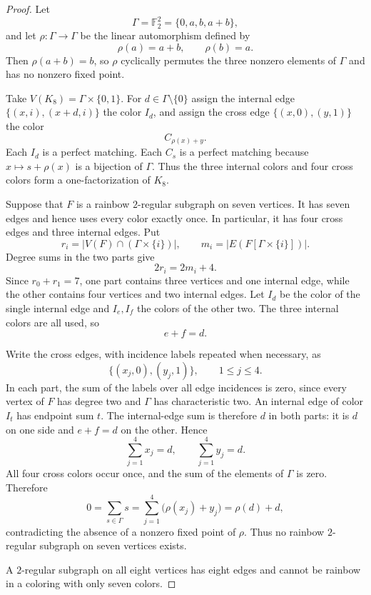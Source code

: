 \documentclass[11pt]{amsart}
\newcommand{\F}{\mathbb{F}}
\begin{document}
\begin{proof}
Let
\[
  \Gamma=\F_2^2=\{0,a,b,a+b\},
\]
and let $\rho\colon\Gamma\to\Gamma$ be the linear automorphism defined by
\[
  \rho(a)=a+b,
  \qquad
  \rho(b)=a.
\]
Then $\rho(a+b)=b$, so $\rho$ cyclically permutes the three nonzero
elements of $\Gamma$ and has no nonzero fixed point.

Take $V(K_8)=\Gamma\times\{0,1\}$.  For $d\in\Gamma\setminus\{0\}$ assign
the internal edge $\{(x,i),(x+d,i)\}$ the color $I_d$, and assign the
cross edge $\{(x,0),(y,1)\}$ the color
\[
  C_{\rho(x)+y}.
\]
Each $I_d$ is a perfect matching.  Each $C_s$ is a perfect matching
because $x\mapsto s+\rho(x)$ is a bijection of $\Gamma$.  Thus the three
internal colors and four cross colors form a one-factorization of $K_8$.

Suppose that $F$ is a rainbow $2$-regular subgraph on seven vertices.
It has seven edges and hence uses every color exactly once.  In
particular, it has four cross edges and three internal edges.  Put
\[
  r_i=\lvert V(F)\cap(\Gamma\times\{i\})\rvert,
  \qquad
  m_i=\lvert E(F[\Gamma\times\{i\}])\rvert.
\]
Degree sums in the two parts give
\[
  2r_i=2m_i+4.
\]
Since $r_0+r_1=7$, one part contains three vertices and one internal edge,
while the other contains four vertices and two internal edges.  Let
$I_d$ be the color of the single internal edge and $I_e,I_f$ the colors
of the other two.  The three internal colors are all used, so
\[
  e+f=d.
\]

Write the cross edges, with incidence labels repeated when necessary, as
\[
  \{(x_j,0),(y_j,1)\},
  \qquad 1\le j\le4.
\]
In each part, the sum of the labels over all edge incidences is zero,
since every vertex of $F$ has degree two and $\Gamma$ has characteristic
two.  An internal edge of color $I_t$ has endpoint sum $t$.  The
internal-edge sum is therefore $d$ in both parts: it is $d$ on one side
and $e+f=d$ on the other.  Hence
\[
  \sum_{j=1}^4x_j=d,
  \qquad
  \sum_{j=1}^4y_j=d.
\]
All four cross colors occur once, and the sum of the elements of
$\Gamma$ is zero.  Therefore
\[
  0
  =\sum_{s\in\Gamma}s
  =\sum_{j=1}^4\bigl(\rho(x_j)+y_j\bigr)
  =\rho(d)+d,
\]
contradicting the absence of a nonzero fixed point of $\rho$.  Thus no
rainbow $2$-regular subgraph on seven vertices exists.

A $2$-regular subgraph on all eight vertices has eight edges and cannot
be rainbow in a coloring with only seven colors.
\end{proof}
\end{document}
